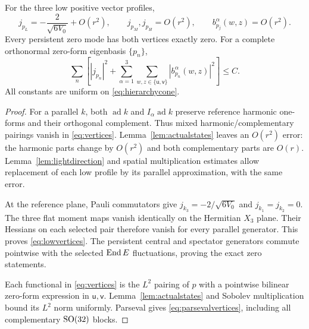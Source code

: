 \begin{proposition}\label{prop:vertices}
For the three low positive vector profiles,
\begin{equation}\label{eq:lowvertices}
 j_{p_L}=-\frac2{\sqrt{6V_0}}+O(r^2),\qquad
 j_{p_M},j_{p_H}=O(r^2),\qquad
 b_{p_j}^\alpha(w,z)=O(r^2).
\end{equation}
Every persistent zero mode has both vertices exactly zero. For a complete
orthonormal zero-form eigenbasis $\{p_n\}$,
\begin{equation}\label{eq:parsevalvertices}
 \sum_n\left[|j_{p_n}|^2+
 \sum_{\alpha=1}^3\sum_{w,z\in\{\mathsf u,\mathsf v\}}
 |b_{p_n}^\alpha(w,z)|^2\right]\le C.
\end{equation}
All constants are uniform on \eqref{eq:hierarchycone}.
\end{proposition}
\begin{proof}
For a parallel $k$, both $\operatorname{ad}k$ and
$I_\alpha\operatorname{ad}k$ preserve reference harmonic one-forms
and their orthogonal complement. Thus mixed harmonic/complementary
pairings vanish in \eqref{eq:vertices}. Lemma~\ref{lem:actualstates}
leaves an $O(r^2)$ error: the harmonic parts change by $O(r^2)$ and
both complementary parts are $O(r)$. Lemma~\ref{lem:lightdirection}
and spatial multiplication estimates allow replacement of each low
profile by its parallel approximation, with the same error.

At the reference plane, Pauli commutators give
$j_{k_3}=-2/\sqrt{6V_0}$ and $j_{k_1}=j_{k_2}=0$. The three flat
moment maps vanish identically on the Hermitian $X_3$ plane. Their
Hessians on each selected pair therefore vanish for every parallel
generator. This proves \eqref{eq:lowvertices}. The persistent central
and spectator generators commute pointwise with the selected
$\operatorname{End} E$ fluctuations, proving the exact zero statements.

Each functional in \eqref{eq:vertices} is the $L^2$ pairing of $p$
with a pointwise bilinear zero-form expression in $\mathsf u,\mathsf v$.
Lemma~\ref{lem:actualstates} and Sobolev multiplication bound its
$L^2$ norm uniformly. Parseval gives \eqref{eq:parsevalvertices},
including all complementary $\operatorname{SO}(32)$ blocks.
\end{proof}
